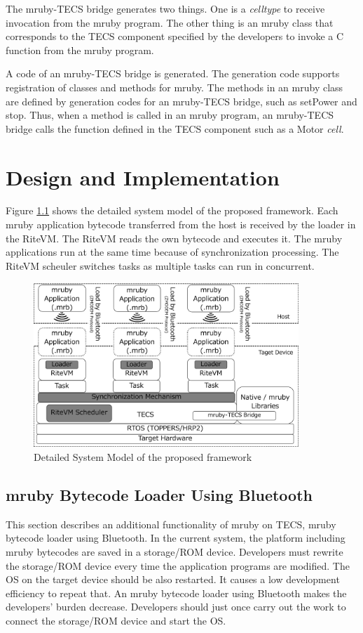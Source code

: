 \documentclass[a4j,12pt,oneside,openany,english]{jsbook}
\begin{document}
The mruby-TECS bridge generates two things.
One is a {\it celltype} to receive invocation from the mruby program.
The other thing is an mruby class that corresponds to the TECS component specified by the developers to invoke a C function from the mruby program.

A code of an mruby-TECS bridge is generated.
The generation code supports registration of classes and methods for mruby.
The methods in an mruby class are defined by generation codes for an mruby-TECS bridge, such as setPower and stop.
Thus, when a method is called in an mruby program, an mruby-TECS bridge calls the function defined in the TECS component such as a Motor {\it cell}.

\chapter{Design and Implementation}
\label{sec:Design and Implementation}
Figure \ref{fig:system_model} shows the detailed system model of the proposed framework.
Each mruby application bytecode transferred from the host is received by the loader in the RiteVM.
The RiteVM reads the own bytecode and executes it.
The mruby applications run at the same time because of synchronization processing.
The RiteVM scheuler switches tasks as multiple tasks can run in concurrent.

\begin{figure}[t]
    \centering
    \includegraphics[width=10cm,clip]{../EMSOFT2016/figure/system_model.pdf}
    \caption{Detailed System Model of the proposed framework}
    \label{fig:system_model}
\end{figure}

\section{mruby Bytecode Loader Using Bluetooth}
\label{sec:mruby bytecode loader using Bluetooth}
This section describes an additional functionality of mruby on TECS, mruby bytecode loader using Bluetooth.
In the current system, the platform including mruby bytecodes are saved in a storage/ROM device.
Developers must rewrite the storage/ROM device every time the application programs are modified.
The OS on the target device should be also restarted.
It causes a low development efficiency to repeat that.
An mruby bytecode loader using Bluetooth makes the developers' burden decrease.
Developers should just once carry out the work to connect the storage/ROM device and start the OS. 
\end{document}
